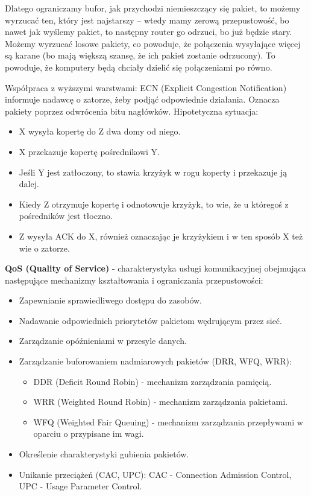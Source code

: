 Dlatego ograniczamy bufor, jak przychodzi niemieszczący się pakiet, to możemy wyrzucać ten, który jest najstarszy -- wtedy mamy zerową przepustowość, bo nawet jak wyślemy pakiet, to następny router go odrzuci, bo już będzie stary. Możemy wyrzucać losowe pakiety, co powoduje, że połączenia wysyłające więcej są karane (bo mają większą szansę, że ich pakiet zostanie odrzucony). To powoduje, że komputery będą chciały dzielić się połączeniami po równo.

Współpraca z wyższymi warstwami: ECN (Explicit Congestion Notification) informuje nadawcę o zatorze, żeby podjąć odpowiednie działania. Oznacza pakiety poprzez odwrócenia bitu nagłówków. Hipotetyczna sytuacja:
\begin{itemize}
	\item X wysyła kopertę do Z dwa domy od niego.
	\item X przekazuje kopertę pośrednikowi Y.
	\item Jeśli Y jest zatłoczony, to stawia krzyżyk w rogu koperty i przekazuje ją dalej.
	\item Kiedy Z otrzymuje kopertę i odnotowuje krzyżyk, to wie, że u któregoś z pośredników jest tłoczno.
	\item Z wysyła ACK do X, również oznaczając je krzyżykiem i w ten sposób X też wie o zatorze.
\end{itemize}

\textbf{QoS (Quality of Service)} - charakterystyka usługi komunikacyjnej obejmująca następujące mechanizmy kształtowania i ograniczania przepustowości:
\begin{itemize}
	\item Zapewnianie sprawiedliwego dostępu do zasobów.
	\item Nadawanie odpowiednich priorytetów pakietom wędrującym przez sieć.
	\item Zarządzanie opóźnieniami w przesyle danych.
	\item Zarządzanie buforowaniem nadmiarowych pakietów (DRR, WFQ, WRR):
	      \begin{itemize}
		      \item DDR (Deficit Round Robin) - mechanizm zarządzania pamięcią.
		      \item WRR (Weighted Round Robin) - mechanizm zarządzania pakietami.
		      \item WFQ (Weighted Fair Queuing) - mechanizm zarządzania przepływami w oparciu o przypisane im wagi.
	      \end{itemize}
	\item Określenie charakterystyki gubienia pakietów.
	\item Unikanie przeciążeń (CAC, UPC): CAC - Connection Admission Control, UPC - Usage Parameter Control.
\end{itemize}

